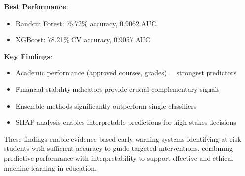 \textbf{Best Performance}:
\begin{itemize}
    \item Random Forest: 76.72\% accuracy, 0.9062 AUC
    \item XGBoost: 78.21\% CV accuracy, 0.9057 AUC
\end{itemize}

\textbf{Key Findings}:
\begin{itemize}
    \item Academic performance (approved courses, grades) = strongest predictors
    \item Financial stability indicators provide crucial complementary signals
    \item Ensemble methods significantly outperform single classifiers
    \item SHAP analysis enables interpretable predictions for high-stakes decisions
\end{itemize}

These findings enable evidence-based early warning systems identifying at-risk students with sufficient accuracy to guide targeted interventions, combining predictive performance with interpretability to support effective and ethical machine learning in education.
